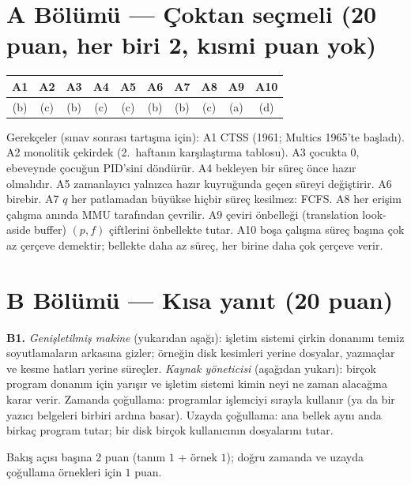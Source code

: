 \section*{A Bölümü --- Çoktan seçmeli (20 puan, her biri 2, kısmi puan yok)}
\begin{center}
\renewcommand{\arraystretch}{1.3}
\begin{tabular}{@{}*{10}{c}@{}}
\toprule
A1 & A2 & A3 & A4 & A5 & A6 & A7 & A8 & A9 & A10 \\
\midrule
(b) & (c) & (b) & (c) & (c) & (b) & (b) & (c) & (a) & (d) \\
\bottomrule
\end{tabular}
\end{center}
Gerekçeler (sınav sonrası tartışma için): A1 CTSS (1961; Multics 1965'te başladı). A2 monolitik çekirdek (2.~haftanın karşılaştırma tablosu). A3  çocukta $0$, ebeveynde çocuğun PID'sini döndürür. A4 bekleyen bir süreç önce hazır olmalıdır. A5 zamanlayıcı yalnızca hazır kuyruğunda geçen süreyi değiştirir. A6 birebir. A7 $q$ her patlamadan büyükse hiçbir süreç kesilmez: FCFS. A8 her erişim çalışma anında MMU tarafından çevrilir. A9 çeviri önbelleği (translation look-aside buffer) $(p, f)$ çiftlerini önbellekte tutar. A10 boşa çalışma süreç başına çok az çerçeve demektir; bellekte daha az süreç, her birine daha çok çerçeve verir.

\section*{B Bölümü --- Kısa yanıt (20 puan)}
\textbf{B1.} \emph{Genişletilmiş makine} (yukarıdan aşağı): işletim sistemi çirkin donanımı temiz soyutlamaların arkasına gizler; örneğin disk kesimleri yerine dosyalar, yazmaçlar ve kesme hatları yerine süreçler. \emph{Kaynak yöneticisi} (aşağıdan yukarı): birçok program donanım için yarışır ve işletim sistemi kimin neyi ne zaman alacağına karar verir. Zamanda çoğullama: programlar işlemciyi sırayla kullanır (ya da bir yazıcı belgeleri birbiri ardına basar). Uzayda çoğullama: ana bellek aynı anda birkaç program tutar; bir disk birçok kullanıcının dosyalarını tutar.
\begin{rubric}Bakış açısı başına 2 puan (tanım $1$ + örnek $1$); doğru zamanda ve uzayda çoğullama örnekleri için $1$ puan.\end{rubric}

